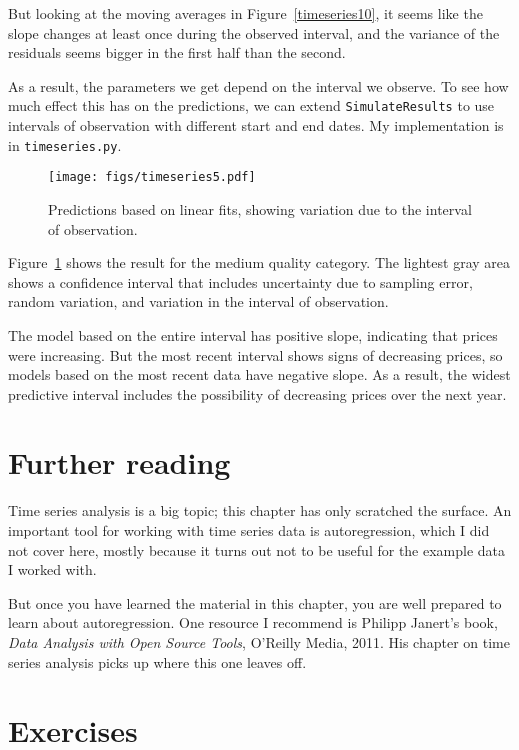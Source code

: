 But looking at the moving averages in Figure~\ref{timeseries10}, it
seems like the slope changes at least once during the observed
interval, and the variance of the residuals seems bigger in the first
half than the second.

As a result, the parameters we get depend on the interval we
observe.  To see how much effect this has on the predictions,
we can extend {\tt SimulateResults} to use intervals of observation
with different start and end dates.  My implementation is in
{\tt timeseries.py}.

\begin{figure}
\centerline{\texttt{[image: figs/timeseries5.pdf]}}
\caption{Predictions based on linear fits, showing
variation due to the interval of observation.}
\label{timeseries5}
\end{figure}

Figure~\ref{timeseries5} shows the result for the medium quality
category.  The lightest gray area shows a confidence interval that
includes uncertainty due to sampling error, random variation, and
variation in the interval of observation.

The model based on the entire interval has positive slope, indicating
that prices were increasing.  But the most recent interval shows signs
of decreasing prices, so models based on the most recent data have
negative slope.  As a result, the widest predictive interval includes
the possibility of decreasing prices over the next year.


\section{Further reading}

Time series analysis is a big topic; this chapter has only scratched
the surface.  An important tool for working with time series data
is autoregression, which I did not cover here, mostly because it turns
out not to be useful for the example data I worked with.

But once you
have learned the material in this chapter, you are well prepared
to learn about autoregression.  One resource I recommend is
Philipp Janert's book, {\it Data Analysis with Open Source Tools},
O'Reilly Media, 2011.  His chapter on time series analysis picks up
where this one leaves off.


\section{Exercises}

